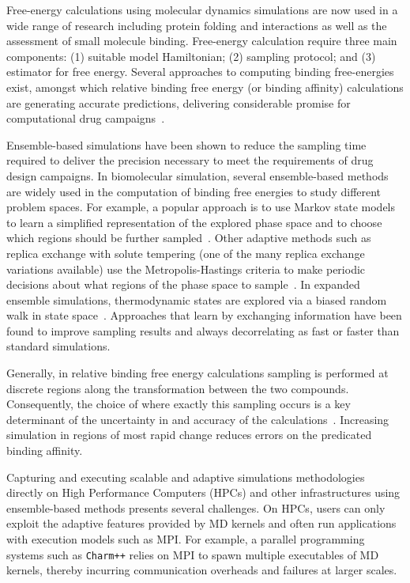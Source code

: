 Free-energy calculations using molecular dynamics simulations are now used in
a wide range of research including protein folding and interactions as well
as the assessment of small molecule binding. Free-energy calculation require
three main components: (1) suitable model Hamiltonian; (2) sampling protocol;
and (3) estimator for free energy. Several approaches to computing binding
free-energies exist, amongst which relative binding free energy (or binding
affinity) calculations are generating accurate predictions, delivering
considerable promise for computational drug campaigns~\cite{Karplus2005}.

Ensemble-based simulations have been shown to reduce the sampling time
required to deliver the precision necessary to meet the requirements of drug
design campaigns. In biomolecular simulation, several ensemble-based methods
are widely used in the computation of binding free energies to study
different problem spaces. For example, a popular approach is to use Markov
state models to learn a simplified representation of the explored phase space
and to choose which regions should be further sampled~\cite{Bowman2010}.
Other adaptive methods such as replica exchange with solute tempering (one of
the many replica exchange variations available) use the Metropolis-Hastings
criteria to make periodic decisions about what regions of the phase space to
sample~\cite{Earl2005,Hritz2008,Kim2012}. In expanded ensemble simulations,
thermodynamic states are explored via a biased random walk in state
space~\cite{Lyubartsev1992}. Approaches that learn by exchanging information
have been found to improve sampling results and always decorrelating as fast
or faster than standard simulations.

Generally, in relative binding free energy calculations sampling is performed
at discrete regions along the transformation between the two compounds.
Consequently, the choice of where exactly this sampling occurs is a key
determinant of the uncertainty in and accuracy of the
calculations~\cite{Ruiter2013}. Increasing simulation in regions of most
rapid change reduces errors on the predicated binding affinity.

Capturing and executing scalable and adaptive simulations methodologies
directly on High Performance Computers (HPCs) and other infrastructures using
ensemble-based methods presents several challenges. On HPCs, users can only
exploit the adaptive features provided by MD kernels and often run
applications with execution models such as MPI. For example, a parallel
programming systems such as \texttt{Charm++} relies on MPI to spawn multiple
executables of MD kernels, thereby incurring communication overheads and
failures at larger scales. 

